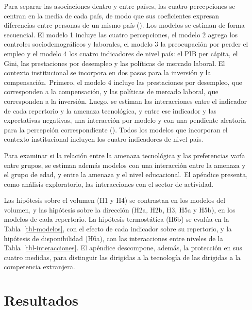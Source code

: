 \documentclass[
  spanish,
  12pt,
]{article}
\begin{document}
Para separar las asociaciones dentro y entre países, las cuatro
percepciones se centran en la media de cada país, de modo que sus
coeficientes expresan diferencias entre personas de un mismo país
().
Los modelos se estiman de forma secuencial. El modelo 1 incluye las
cuatro percepciones, el modelo 2 agrega los controles sociodemográficos
y laborales, el modelo 3 la preocupación por perder el empleo y el
modelo 4 los cuatro indicadores de nivel país: el PIB per cápita, el
Gini, las prestaciones por desempleo y las políticas de mercado laboral.
El contexto institucional se incorpora en dos pasos para la inversión y
la compensación. Primero, el modelo 4 incluye las prestaciones por
desempleo, que corresponden a la compensación, y las políticas de
mercado laboral, que corresponden a la inversión. Luego, se estiman las
interacciones entre el indicador de cada repertorio y la amenaza
tecnológica, y entre ese indicador y las expectativas negativas, una
interacción por modelo y con una pendiente aleatoria para la percepción
correspondiente
(). Todos los
modelos que incorporan el contexto institucional incluyen los cuatro
indicadores de nivel país.

Para examinar si la relación entre la amenaza tecnológica y las
preferencias varía entre grupos, se estiman además modelos con una
interacción entre la amenaza y el grupo de edad, y entre la amenaza y el
nivel educacional. El apéndice presenta, como análisis exploratorio, las
interacciones con el sector de actividad.

Las hipótesis sobre el volumen (H1 y H4) se contrastan en los modelos
del volumen, y las hipótesis sobre la dirección (H2a, H2b, H3, H5a y
H5b), en los modelos de cada repertorio. La hipótesis termostática (H6b)
se evalúa en la Tabla~\ref{tbl-modelos}, con el efecto de cada indicador
sobre su repertorio, y la hipótesis de disponibilidad (H6a), con las
interacciones entre niveles de la Tabla~\ref{tbl-interacciones}. El
apéndice descompone, además, la protección en sus cuatro medidas, para
distinguir las dirigidas a la tecnología de las dirigidas a la
competencia extranjera.

\section{Resultados}\label{resultados}
\end{document}
